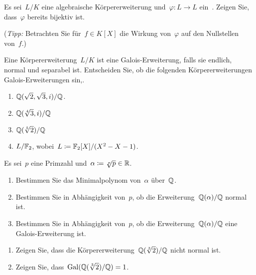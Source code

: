 \documentclass{scrartcl}
\begin{document}
\begin{exercise}
  Es sei~$L/K$ eine algebraische Körpererweiterung und~$\varphi \colon L \to L$ ein~.
  Zeigen Sie, dass~$\varphi$ bereits bijektiv ist.

  (\emph{Tipp:} Betrachten Sie für~$f \in K[X]$ die Wirkung von~$\varphi$ auf den Nullstellen von~$f$.)
\end{exercise}

\begin{exercise}[subtitle = {Erstklausur~18/19, Erstklausur~19/20}]
  Eine Körpererweiterung~$L/K$ ist eine Galois-Erweiterung, falls sie endlich, normal und separabel ist.
  Entscheiden Sie, ob die folgenden Körpererweiterungen Galois-Erweiterungen sin,.
  \begin{enumerate}
    \item
      $\mathbb{Q}( \sqrt{2}, \sqrt{3}, i ) / \mathbb{Q}$.
    \item
      $\mathbb{Q}(\sqrt[4]{3}, i) / \mathbb{Q}$
    \item
      $\mathbb{Q}(\sqrt[5]{2}) / \mathbb{Q}$
    \item
      $L / \mathbb{F}_2$, wobei~$L \coloneqq \mathbb{F}_2[X] / (X^2 - X - 1)$.
  \end{enumerate}
\end{exercise}

\begin{exercise}[subtitle = {Erstklausur~18/19}]
  Es sei~$p$ eine Primzahl und~$\alpha \coloneqq \sqrt[p]{p} \in \mathbb{R}$.
  \begin{enumerate}
    \item
      Bestimmen Sie das Minimalpolynom von~$\alpha$ über~$\mathbb{Q}$.
    \item
      Bestimmen Sie in Abhängigkeit von~$p$, ob die Erweiterung~$\mathbb{Q}(\alpha) / \mathbb{Q}$ normal ist.
    \item
      Bestimmen Sie in Abhängigkeit von~$p$, ob die Erweiterung~$\mathbb{Q}(\alpha) / \mathbb{Q}$ eine Galois-Erweiterung ist.
  \end{enumerate}
\end{exercise}

\begin{exercise}[subtitle = {Erstklausur~18/19}]
  \begin{enumerate}
    \item
      Zeigen Sie, dass die Körpererweiterung~$\mathbb{Q}(\sqrt[3]{2}) / \mathbb{Q}$ nicht normal ist.
    \item
      Zeigen Sie, dass~$\operatorname{Gal}( \mathbb{Q}(\sqrt[3]{2}) / \mathbb{Q} ) = 1$.
  \end{enumerate}
\end{exercise}
\end{document}
